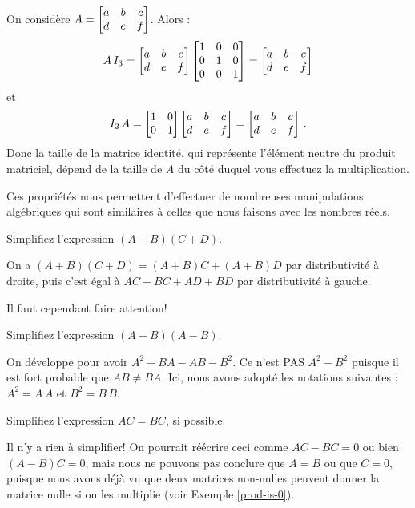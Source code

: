 \begin{myexample} On considère $A = \left[ \begin{matrix} a & b & c\\ d&e&f \end{matrix} \right]$. Alors :
$$
A\, I_3 = \left[ \begin{matrix} a & b & c\\ d&e&f \end{matrix} \right]\left[ \begin{matrix} 1&0&0\\0&1&0\\0&0&1 \end{matrix} \right] = \left[ \begin{matrix} a & b & c\\ d&e&f \end{matrix} \right]
$$
et
$$
I_2\,A = \left[ \begin{matrix} 1&0\\0&1 \end{matrix} \right]\left[ \begin{matrix} a & b & c\\ d&e&f \end{matrix} \right]=\left[ \begin{matrix} a & b & c\\ d&e&f \end{matrix} \right]\,.
$$
Donc la taille de la matrice identité, qui repr\'esente l'\'el\'ement neutre du produit matriciel, dépend de la taille de $A$  du côté duquel vous effectuez la multiplication.
\end{myexample}


Ces propriétés nous permettent d'effectuer de nombreuses manipulations algébriques qui sont similaires à celles que nous faisons avec les nombres réels.

\begin{myprob}
Simplifiez l'expression $(A+B)(C+D)$.

\begin{mysol}
On a $(A+B)(C+D) = (A+B)C + (A+B)D$ par distributivité à droite, puis c'est égal à $AC + BC + AD + BD$ par distributivité à gauche.
\end{mysol}\end{myprob}

Il faut cependant faire attention!

\begin{myprob} Simplifiez l'expression $(A+B)(A-B)$.

\begin{mysol} On d\'eveloppe pour avoir $A^2 + BA - AB - B^2$.  Ce n'est PAS $A^2-B^2$ puisque
il est fort probable que $AB \neq BA$. Ici, nous avons adopté les notations suivantes :$A^2=A\, A$ et $B^2=B\,B$.
\end{mysol}\end{myprob}

\begin{myprob} Simplifiez l'expression $AC = BC$, si possible.

\begin{mysol} Il n'y a rien à simplifier! On pourrait réécrire ceci comme $AC-BC = 0$ ou bien $(A-B)C = 0$, mais nous ne pouvons pas conclure que $A=B$ ou que $C=0$, puisque nous avons déjà vu que deux matrices non-nulles peuvent donner la matrice nulle si on les multiplie (voir Exemple \ref{prod-is-0}).
\end{mysol}\end{myprob}

